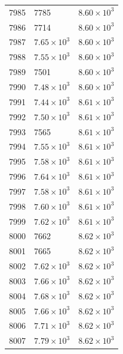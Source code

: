 \begin{table}[H]
\begin{tabular}{lll}
7985 & 7785 & $\displaystyle 8.60 \times 10^{3}$ \\
7986 & 7714 & $\displaystyle 8.60 \times 10^{3}$ \\
7987 & $\displaystyle 7.65 \times 10^{3}$ & $\displaystyle 8.60 \times 10^{3}$ \\
7988 & $\displaystyle 7.55 \times 10^{3}$ & $\displaystyle 8.60 \times 10^{3}$ \\
7989 & 7501 & $\displaystyle 8.60 \times 10^{3}$ \\
7990 & $\displaystyle 7.48 \times 10^{3}$ & $\displaystyle 8.60 \times 10^{3}$ \\
7991 & $\displaystyle 7.44 \times 10^{3}$ & $\displaystyle 8.61 \times 10^{3}$ \\
7992 & $\displaystyle 7.50 \times 10^{3}$ & $\displaystyle 8.61 \times 10^{3}$ \\
7993 & 7565 & $\displaystyle 8.61 \times 10^{3}$ \\
7994 & $\displaystyle 7.55 \times 10^{3}$ & $\displaystyle 8.61 \times 10^{3}$ \\
7995 & $\displaystyle 7.58 \times 10^{3}$ & $\displaystyle 8.61 \times 10^{3}$ \\
7996 & $\displaystyle 7.64 \times 10^{3}$ & $\displaystyle 8.61 \times 10^{3}$ \\
7997 & $\displaystyle 7.58 \times 10^{3}$ & $\displaystyle 8.61 \times 10^{3}$ \\
7998 & $\displaystyle 7.60 \times 10^{3}$ & $\displaystyle 8.61 \times 10^{3}$ \\
7999 & $\displaystyle 7.62 \times 10^{3}$ & $\displaystyle 8.61 \times 10^{3}$ \\
8000 & 7662 & $\displaystyle 8.62 \times 10^{3}$ \\
8001 & 7665 & $\displaystyle 8.62 \times 10^{3}$ \\
8002 & $\displaystyle 7.62 \times 10^{3}$ & $\displaystyle 8.62 \times 10^{3}$ \\
8003 & $\displaystyle 7.66 \times 10^{3}$ & $\displaystyle 8.62 \times 10^{3}$ \\
8004 & $\displaystyle 7.68 \times 10^{3}$ & $\displaystyle 8.62 \times 10^{3}$ \\
8005 & $\displaystyle 7.66 \times 10^{3}$ & $\displaystyle 8.62 \times 10^{3}$ \\
8006 & $\displaystyle 7.71 \times 10^{3}$ & $\displaystyle 8.62 \times 10^{3}$ \\
8007 & $\displaystyle 7.79 \times 10^{3}$ & $\displaystyle 8.62 \times 10^{3}$ \\

\end{tabular}
\end{table}
